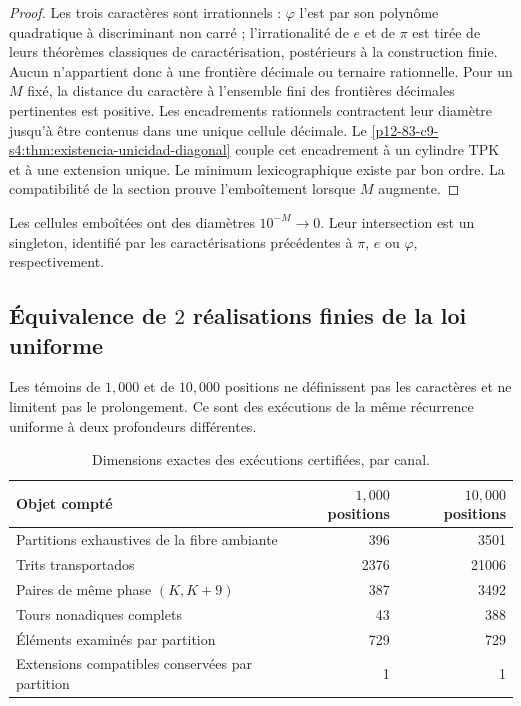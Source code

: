 \begin{proof}
Les trois caractères sont irrationnels : \(\varphi\) l’est par son polynôme
quadratique à discriminant non carré ; l’irrationalité de \(e\) et de
\(\pi\) est tirée de leurs théorèmes classiques de caractérisation, postérieurs à
la construction finie. Aucun n’appartient donc à une frontière décimale ou
ternaire rationnelle. Pour un \(M\) fixé, la distance du caractère à l’ensemble
fini des frontières décimales pertinentes est positive. Les encadrements
rationnels contractent leur diamètre jusqu’à être contenus dans une unique cellule décimale.
Le \cref{p12-83-c9-s4:thm:existencia-unicidad-diagonal} couple cet encadrement à un
cylindre TPK et à une extension unique. Le minimum lexicographique existe par
bon ordre. La compatibilité de la section prouve l’emboîtement lorsque
\(M\) augmente.
\end{proof}

\begin{corollary}
Les cellules emboîtées ont des diamètres \(10^{-M}\to0\). Leur intersection est
un singleton, identifié par les caractérisations précédentes à
\(\pi\), \(e\) ou \(\varphi\), respectivement.
\end{corollary}

\subsection{Équivalence de \(2\) réalisations finies de la loi uniforme}

Les témoins de \(1,000\) et de \(10,000\) positions ne définissent pas les
caractères et ne limitent pas le prolongement. Ce sont des exécutions de la même récurrence
uniforme à deux profondeurs différentes.

\begin{table}[htbp]
\centering
\caption{Dimensions exactes des exécutions certifiées, par canal.}
\label{p12-83-c9-s4:tab:dimensiones-ejecuciones-1000-10000}
\begin{tabular}{lrr}
\toprule
Objet compté & \(1,000\) positions & \(10,000\) positions\\
\midrule
Partitions exhaustives de la fibre ambiante & 396 & 3501\\
Trits transportados & 2376 & 21006\\
Paires de même phase \((K,K+9)\) & 387 & 3492\\
Tours nonadiques complets & 43 & 388\\
Éléments examinés par partition & 729 & 729\\
Extensions compatibles conservées par partition & 1 & 1\\
\bottomrule
\end{tabular}
\end{table}

